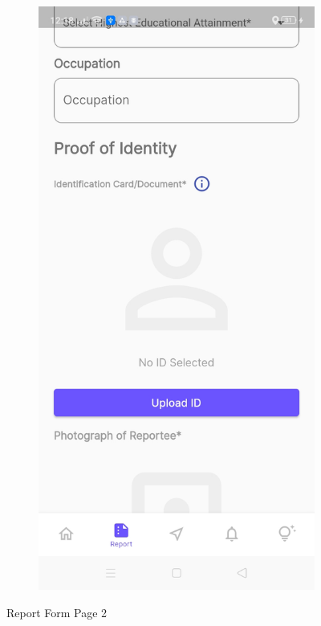 \begin{figure}[!h]
\begin{subfigure}[c]{0.30\linewidth}
        \centering
        \includegraphics[scale=0.15]{figures/Chapter4/Main/p2-3.jpg}
    \end{subfigure}
    \caption{Report Form Page 2}
    \label{fig:ReportPage2}
\end{figure}

